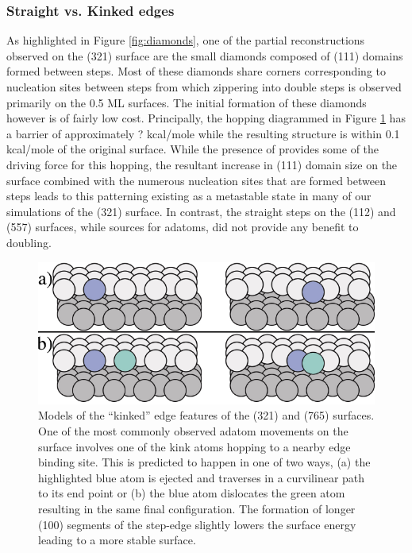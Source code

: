 \subsubsection{Straight vs. Kinked edges}
As highlighted in Figure \ref{fig:diamonds}, one of the partial reconstructions
observed on the (321) surface are the small diamonds composed of (111) domains
formed between steps. Most of these diamonds share corners corresponding to
nucleation sites between steps from which zippering into double steps is
observed primarily on the 0.5 ML surfaces. The initial formation of these
diamonds however is of fairly low cost. Principally, the hopping
diagrammed in Figure \ref{fig:kinkSketch} has a barrier of approximately ?
kcal/mole while the resulting structure is within 0.1 kcal/mole of the original
surface. While the presence of  provides some of the driving force for
this hopping, the resultant increase in (111) domain size on the surface
combined with the numerous nucleation sites that are formed between steps leads
to this patterning existing as a metastable state in many of our simulations of
the (321) surface. In contrast, the straight steps on the (112) and (557)
surfaces, while sources for adatoms, did not provide any benefit to doubling.

\begin{figure}
  \includegraphics[width=\linewidth]{../figures/chap4/kinkMovement.pdf}
  \caption{Models of the ``kinked'' edge features of the (321) and (765)
surfaces.  One of the most commonly observed adatom movements on the surface
involves one of the kink atoms hopping to a nearby edge binding site. This is
predicted to happen in one of two ways, (a) the highlighted blue atom is
ejected and traverses in a curvilinear path to its end point or (b) the blue
atom dislocates the green atom resulting in the same final configuration. The
formation of longer (100) segments of the step-edge slightly lowers the surface
energy leading to a more stable surface.}
  \label{fig:kinkSketch}
\end{figure}

